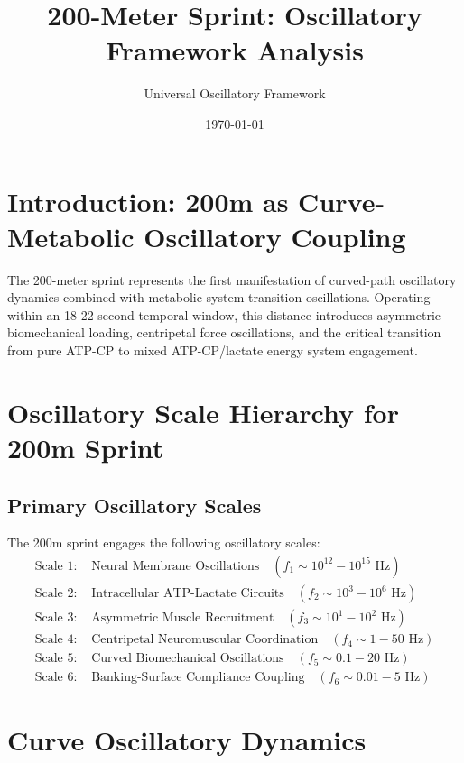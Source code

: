 \documentclass[12pt]{article}
\title{200-Meter Sprint: Oscillatory Framework Analysis}
\author{Universal Oscillatory Framework}
\date{\today}
\begin{document}
\maketitle

\section{Introduction: 200m as Curve-Metabolic Oscillatory Coupling}

The 200-meter sprint represents the first manifestation of curved-path oscillatory dynamics combined with metabolic system transition oscillations. Operating within an 18-22 second temporal window, this distance introduces asymmetric biomechanical loading, centripetal force oscillations, and the critical transition from pure ATP-CP to mixed ATP-CP/lactate energy system engagement.

\section{Oscillatory Scale Hierarchy for 200m Sprint}

\subsection{Primary Oscillatory Scales}

\begin{definition}
The 200m sprint engages the following oscillatory scales:
\begin{align}
\text{Scale 1: } &\text{Neural Membrane Oscillations} \quad (f_1 \sim 10^{12}-10^{15} \text{ Hz}) \\
\text{Scale 2: } &\text{Intracellular ATP-Lactate Circuits} \quad (f_2 \sim 10^3-10^6 \text{ Hz}) \\
\text{Scale 3: } &\text{Asymmetric Muscle Recruitment} \quad (f_3 \sim 10^{1}-10^{2} \text{ Hz}) \\
\text{Scale 4: } &\text{Centripetal Neuromuscular Coordination} \quad (f_4 \sim 1-50 \text{ Hz}) \\
\text{Scale 5: } &\text{Curved Biomechanical Oscillations} \quad (f_5 \sim 0.1-20 \text{ Hz}) \\
\text{Scale 6: } &\text{Banking-Surface Compliance Coupling} \quad (f_6 \sim 0.01-5 \text{ Hz})
\end{align}
\end{definition}

\section{Curve Oscillatory Dynamics}
\end{document}
